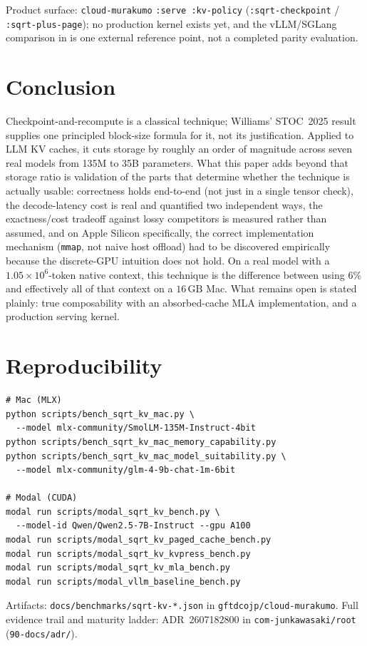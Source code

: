 \documentclass[11pt]{article}
\begin{document}
Product surface: \texttt{cloud-murakumo} \texttt{:serve :kv-policy}
(\texttt{:sqrt-checkpoint} / \texttt{:sqrt-plus-page}); no production
kernel exists yet, and the vLLM/SGLang comparison in  is one
external reference point, not a completed parity evaluation.

\section{Conclusion}

Checkpoint-and-recompute is a classical technique; Williams' STOC~2025
result supplies one principled block-size formula for it, not its
justification. Applied to LLM KV caches, it cuts storage by roughly an
order of magnitude across seven real models from 135M to 35B parameters.
What this paper adds beyond that storage ratio is validation of the parts
that determine whether the technique is actually usable: correctness holds
end-to-end (not just in a single tensor check), the decode-latency cost is
real and quantified two independent ways, the exactness/cost tradeoff
against lossy competitors is measured rather than assumed, and on Apple
Silicon specifically, the correct implementation mechanism (\texttt{mmap},
not naive host offload) had to be discovered empirically because the
discrete-GPU intuition does not hold. On a real model with a
$1.05\times10^{6}$-token native context, this technique is the difference
between using $6\%$ and effectively all of that context on a $16\,\mathrm{GB}$
Mac. What remains open is stated plainly: true composability with an
absorbed-cache MLA implementation, and a production serving kernel.

\section*{Reproducibility}
\begin{verbatim}
# Mac (MLX)
python scripts/bench_sqrt_kv_mac.py \
  --model mlx-community/SmolLM-135M-Instruct-4bit
python scripts/bench_sqrt_kv_mac_memory_capability.py
python scripts/bench_sqrt_kv_mac_model_suitability.py \
  --model mlx-community/glm-4-9b-chat-1m-6bit

# Modal (CUDA)
modal run scripts/modal_sqrt_kv_bench.py \
  --model-id Qwen/Qwen2.5-7B-Instruct --gpu A100
modal run scripts/modal_sqrt_kv_paged_cache_bench.py
modal run scripts/modal_sqrt_kv_kvpress_bench.py
modal run scripts/modal_sqrt_kv_mla_bench.py
modal run scripts/modal_vllm_baseline_bench.py
\end{verbatim}
Artifacts: \texttt{docs/benchmarks/sqrt-kv-*.json} in
\texttt{gftdcojp/cloud-murakumo}. Full evidence trail and maturity ladder:
ADR~2607182800 in \texttt{com-junkawasaki/root}
(\texttt{90-docs/adr/}).



\end{document}
